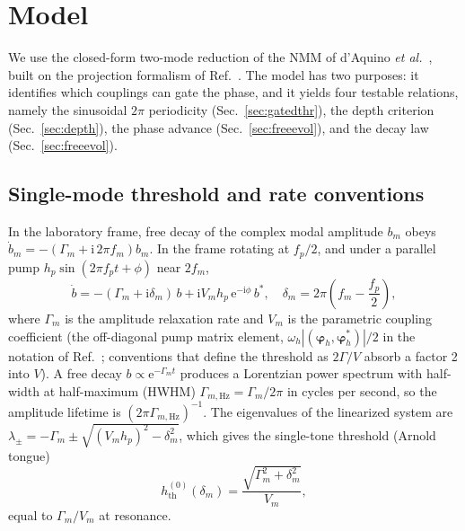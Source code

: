 \documentclass[aps,prb,reprint,superscriptaddress,floatfix]{revtex4-2}
\newcommand{\ii}{\mathrm{i}}
\newcommand{\ee}{\mathrm{e}}
\begin{document}
\section{Model}\label{sec:theory}

We use the closed-form two-mode reduction of the NMM of d'Aquino \textit{et al.}\ \cite{daquino26}, built on the projection formalism of Ref.~\cite{perna22}. The model has two purposes: it identifies which couplings can gate the phase, and it yields four testable relations, namely the sinusoidal $2\pi$ periodicity (Sec.~\ref{sec:gatedthr}), the depth criterion (Sec.~\ref{sec:depth}), the phase advance (Sec.~\ref{sec:freeevol}), and the decay law (Sec.~\ref{sec:freeevol}).

\subsection{Single-mode threshold and rate conventions}\label{sec:single}

In the laboratory frame, free decay of the complex modal amplitude $b_m$ obeys $\dot b_m=-(\Gamma_m+\ii\,2\pi f_m)b_m$. In the frame rotating at $f_p/2$, and under a parallel pump $h_p\sin(2\pi f_p t+\phi)$ near $2f_m$,
\begin{equation}
\dot b=-(\Gamma_m+\ii\delta_m)\,b+\ii V_m h_p\,\ee^{-\ii\phi}\,b^*,\quad \delta_m=2\pi\!\left(f_m-\frac{f_p}{2}\right),
\label{eq:single}
\end{equation}
where $\Gamma_m$ is the amplitude relaxation rate and $V_m$ is the parametric coupling coefficient (the off-diagonal pump matrix element, $\omega_h|(\boldsymbol\varphi_h,\boldsymbol\varphi_h^*)|/2$ in the notation of Ref.~\cite{daquino26}; conventions that define the threshold as $2\Gamma/V$ absorb a factor 2 into $V$). A free decay $b\propto\ee^{-\Gamma_mt}$ produces a Lorentzian power spectrum with half-width at half-maximum (HWHM) $\Gamma_{m,\mathrm{Hz}}=\Gamma_m/2\pi$ in cycles per second, so the amplitude lifetime is $(2\pi\Gamma_{m,\mathrm{Hz}})^{-1}$. The eigenvalues of the linearized system are $\lambda_\pm=-\Gamma_m\pm\sqrt{(V_mh_p)^2-\delta_m^2}$, which gives the single-tone threshold (Arnold tongue)
\begin{equation}
h^{(0)}_{\mathrm{th}}(\delta_m)=\frac{\sqrt{\Gamma_m^2+\delta_m^2}}{V_m},
\label{eq:arnold}
\end{equation}
equal to $\Gamma_m/V_m$ at resonance.
\end{document}
